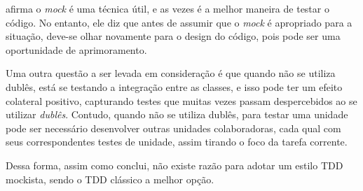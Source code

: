  afirma o \textit{mock} é uma técnica útil, e as vezes é a melhor maneira de testar o código. No entanto, ele diz que antes de assumir que o \textit{mock} é apropriado para a situação, deve-se olhar novamente para o design do código, pois pode ser uma oportunidade de aprimoramento.

Uma outra questão a ser levada em consideração é que quando não se utiliza dublês, está se testando a integração entre as classes, e isso pode ter um efeito colateral positivo, capturando testes que muitas vezes passam despercebidos ao se utilizar \textit{dublês}. Contudo, quando não se utiliza dublês, para testar uma unidade pode ser necessário desenvolver outras unidades colaboradoras, cada qual com seus correspondentes testes de unidade, assim tirando o foco da tarefa corrente.

Dessa forma, assim como  conclui, não existe razão para adotar um estilo TDD mockista, sendo o TDD clássico a melhor opção.